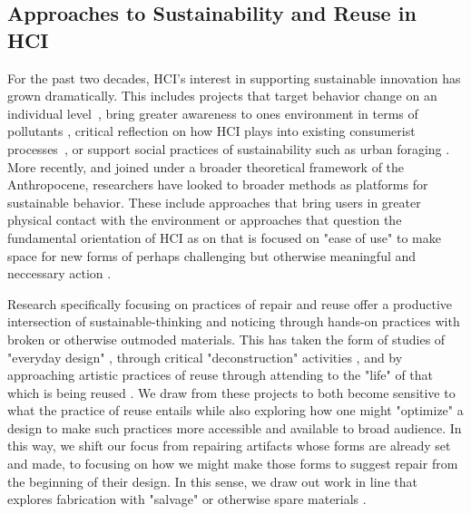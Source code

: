 \documentclass{sigchi}
\begin{document}
\subsection{Approaches to Sustainability and Reuse in HCI}
For the past two decades, HCI's interest in supporting sustainable innovation has grown dramatically. This includes projects that target behavior change on an individual level~\mbox{\cite{disalvo_mapping_2010, dourish_hci_2010}}, bring greater awareness to ones environment in terms of pollutants \cite{kim_wearair:_2010, da_costa_interspecies_nodate, aoki_vehicle_2009}, critical reflection on how HCI plays into existing consumerist processes~\mbox{\cite{blevis_sustainable_2007, pan_fashion_2014,raghavan_means_2017}}, or support social practices of sustainability such as urban foraging \cite{disalvo_fruit_2017}. More recently, and joined under a broader theoretical framework of the Anthropocene, researchers have looked to broader methods as platforms for sustainable behavior. These include approaches that bring users in greater physical contact with the environment \mbox{\cite{liu_design_nodate, kuznetsov_nurturing_2011, light_design_2017}} or approaches that question the fundamental orientation of HCI as on that is focused on "ease of use" \cite{light_design_2017} to make space for new forms of perhaps challenging but otherwise meaningful and neccessary action \cite{devendorf_hci-amusement_2019, Dew:2018:MWL:3232617.3232626, Dew:2019:DWS:3322276.3322320}.

Research specifically focusing on practices of repair and reuse \mbox{\cite{jackson_repair_2012, Dew:2019:DWS:3322276.3322320, Dew:2018:LWC:3173574.3174159, Wyche_postcolonialphone, Wakkary_greendesignfiction, Tsaknaki_thingsfallapart}} offer a productive intersection of sustainable-thinking and noticing through hands-on practices with broken or otherwise outmoded materials. This has taken the form of studies of "everyday design" \mbox{\cite{Wakkary:2009:SIC:1518701.1518761, Maestri:2011:URC:2069618.2069633}}, through critical "deconstruction" activities \cite{Murer:2018:MTA:3196709.3196806, Murer:2015:DID:2882850.2882860, Murer:2017:UDE:3024969.3024993}
, and by approaching artistic practices of reuse through attending to the "life" of that which is being reused \cite{jackson_breakdown_2014}. We draw from these projects to both become sensitive to what the practice of reuse entails while also exploring how one might "optimize" a design to make such practices more accessible and available to broad audience. In this way, we shift our focus from repairing artifacts whose forms are already set and made, to focusing on how we might make those forms to suggest repair from the beginning of their design. In this sense, we draw out work in line that explores fabrication with "salvage" \cite{Dew:2019:DWS:3322276.3322320} or otherwise spare materials \cite{devendorf_being_2015,KovacsTrussFormer}. 
\end{document}
